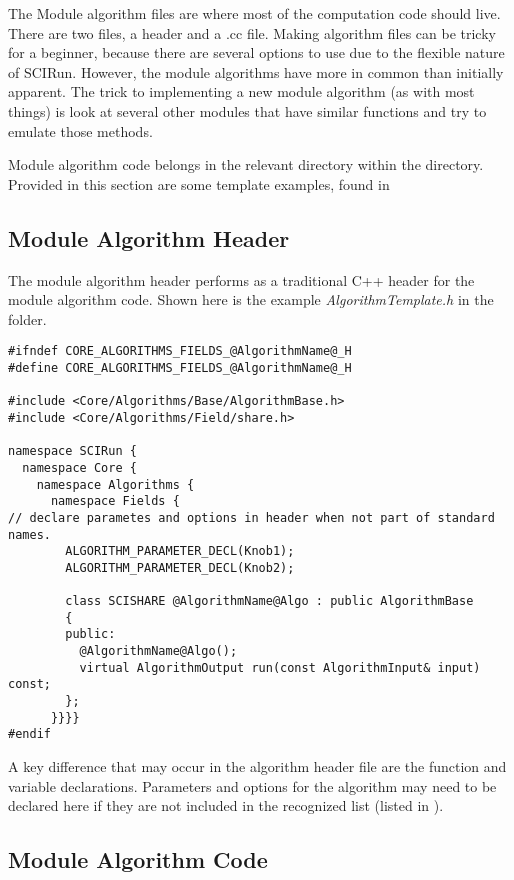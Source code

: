 \documentclass[fleqn,11pt,openany]{book}
\begin{document}
The Module algorithm files are where most of the computation code should live.  
There are two files, a header and a .cc file. 
Making algorithm files can be tricky for a beginner, because there are several options to use due to the flexible nature of SCIRun.  
However, the module algorithms have more in common than initially apparent.
The trick to implementing a new module algorithm (as with most things) is look at several other modules that have similar functions and try to emulate those methods.  

Module algorithm code belongs in the relevant directory within the \emph{} directory.
Provided in this section are some template examples, found in \emph{}

\subsection{Module Algorithm Header}

The module algorithm header performs as a traditional C++ header for the module algorithm code.  
Shown here is the example \emph{AlgorithmTemplate.h} in the \emph{} folder.
\begin{verbatim}
#ifndef CORE_ALGORITHMS_FIELDS_@AlgorithmName@_H
#define CORE_ALGORITHMS_FIELDS_@AlgorithmName@_H

#include <Core/Algorithms/Base/AlgorithmBase.h>
#include <Core/Algorithms/Field/share.h>

namespace SCIRun {
  namespace Core {
    namespace Algorithms {
      namespace Fields {
// declare parametes and options in header when not part of standard names. 
        ALGORITHM_PARAMETER_DECL(Knob1);
        ALGORITHM_PARAMETER_DECL(Knob2);

        class SCISHARE @AlgorithmName@Algo : public AlgorithmBase
        {
        public:
          @AlgorithmName@Algo();
          virtual AlgorithmOutput run(const AlgorithmInput& input) const; 
        };
      }}}}
#endif 
\end{verbatim}
A key difference that may occur in the algorithm header file are the function and variable declarations.
Parameters and options for the algorithm may need to be declared here if they are not included in the recognized list (listed in \emph{}).

\subsection{Module Algorithm Code}
\end{document}
